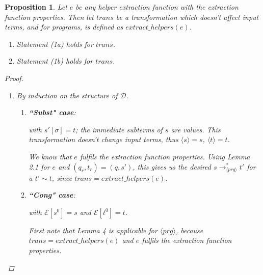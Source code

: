 \documentclass[11pt]{article} %
\newtheorem{proposition}{Proposition}
\begin{document}
\begin{proposition}

Let $e$ be any helper extraction function with the extraction function properties. Then let $trans$ be a transformation which doesn't affect input terms, and for programs, is defined as $extract\_helpers(e)$.

\begin{enumerate}

\item Statement (1a) holds for $trans$.

\item Statement (1b) holds for $trans$.

\end{enumerate}

\begin{proof} ~

\begin{enumerate}

\item By induction on the structure of $\mathcal{D}$.

\begin{enumerate}
\item \textbf{``Subst" case}:

\begin{prooftree}
\end{prooftree}

with $s'[\sigma] = t$; the immediate subterms of $s$ are values. This transformation doesn't change input terms, thus $\langle s \rangle = s$, $\langle t \rangle = t$.

We know that $e$ fulfils the extraction function properties. Using Lemma 2.1 for $e$ and $(q_r, t_r) = (q, s')$, this gives us the desired $s \longrightarrow_{\langle prg \rangle}^* t'$ for a $t' \sim t$, since $trans = extract\_helpers(e)$.

\item \textbf{``Cong" case}:

\begin{prooftree}
\end{prooftree}

with $\mathcal{E}[s^0] = s$ and $\mathcal{E}[t^0] = t$.

First note that Lemma 4 is applicable for $\langle prg \rangle$, because $trans = extract\_helpers(e)$ and $e$ fulfils the extraction function properties.


\end{enumerate}
\end{enumerate}
\end{proof}
\end{proposition}
\end{document}
